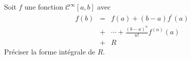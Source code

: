 Soit $f$ une fonction $\mathcal{C}^\infty[a,b]$ avec \begin{eqnarray*}
f(b)&=&f(a)+(b-a)f^\prime (a)\\&+&\cdots + \frac{(b-a)^n}{n!}f^{(n)}(a)\\
&+& R
\end{eqnarray*}
Pr\'eciser la forme int\'egrale de $R$.\bigskip \bigskip